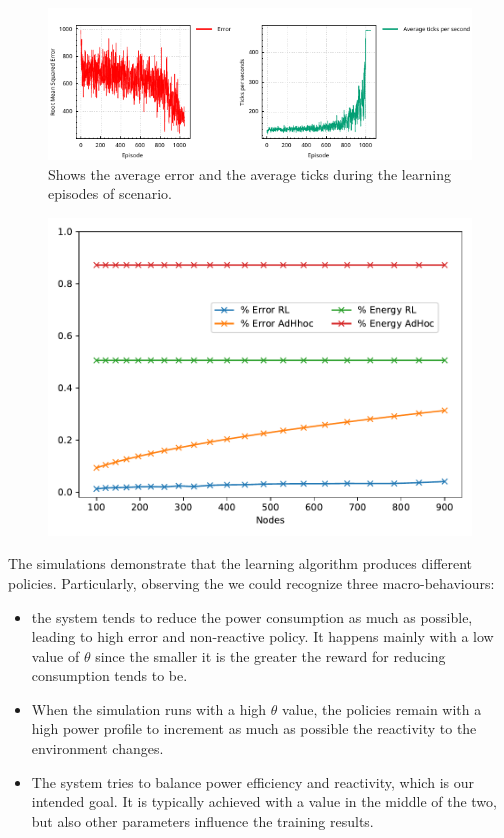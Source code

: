 \begin{figure}
    \centering
    \includegraphics[width=\textwidth]{papers/acsos2022/img//error-and-ticks.pdf}
    \caption{Shows the average error and the average ticks during the learning episodes of \swapscen{} scenario. }
    \label{acsos2022:fig:training-performance}
 \end{figure}
 \begin{figure}
    \centering
    \includegraphics[width=0.8\linewidth]{papers/acsos2022/img//plain-gradient.pdf}
    \caption[Error and energy saving percentage (see ) as nodes vary.]{}
    \label{acsos2022:fig:check-scale}
 \end{figure}
The simulations demonstrate 
 that the learning algorithm produces different policies. 
 Particularly, observing the  we could recognize three macro-behaviours:
\begin{itemize}
    \item the system tends to reduce the power consumption as much as possible, 
     leading to high error and non-reactive policy. 
     It happens mainly with a low value of $\theta$ since the smaller it is 
     the greater the reward for reducing consumption tends to be.
    \item When the simulation runs with a high $\theta$ value, 
    the policies remain with a high power profile to increment 
    as much as possible the reactivity to the environment changes. 
    \item The system tries to balance power efficiency and reactivity, 
    which is our intended goal. 
    It is typically achieved with a value in the middle of the two, 
    but also other parameters influence the training results.
\end{itemize}

